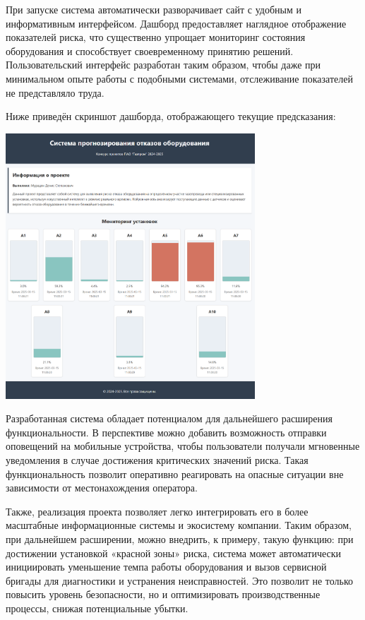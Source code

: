 \documentclass[a4paper,12pt]{article}
\begin{document}
\begin{flushleft}
При запуске система автоматически разворачивает сайт с удобным и информативным интерфейсом.
Дашборд предоставляет наглядное отображение показателей риска, что существенно упрощает мониторинг
состояния оборудования и способствует своевременному принятию решений. Пользовательский интерфейс разработан таким
образом, чтобы даже при минимальном опыте работы с подобными системами, отслеживание показателей не представляло труда.

Ниже приведён скриншот дашборда, отображающего текущие предсказания:
\begin{center}
    \includegraphics[width=0.7\textwidth]{../../Include/dashboard.png}
\end{center}

Разработанная система обладает потенциалом для дальнейшего расширения функциональности.
В перспективе можно добавить возможность отправки оповещений на мобильные устройства,
чтобы пользователи получали мгновенные уведомления в случае достижения критических значений риска.
Такая функциональность позволит оперативно реагировать на опасные ситуации вне зависимости от местонахождения оператора.

Также, реализация проекта позволяет легко интегрировать его в более масштабные информационные системы и экосистему компании.
Таким образом, при дальнейшем расширении, можно внедрить, к примеру, такую функцию: при достижении установкой
«красной зоны» риска, система может автоматически инициировать уменьшение темпа работы оборудования и вызов сервисной бригады
для диагностики и устранения неисправностей.
Это позволит не только повысить уровень безопасности, но и оптимизировать производственные процессы, снижая потенциальные убытки.


\end{flushleft}
\end{document}

